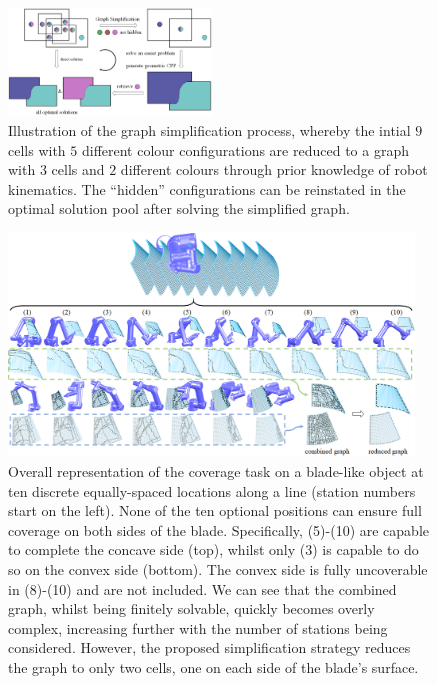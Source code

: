 \documentclass[letterpaper, 10pt, conference]{ieeeconf}
\begin{document}
\begin{figure}[t]
\centering
\includegraphics[width = 0.48\textwidth]{figures/graph_simplification}
\caption{Illustration of the graph simplification process, whereby the intial $9$ cells with $5$ different colour configurations are reduced to a graph with $3$ cells and $2$ different colours through prior knowledge of robot kinematics. The ``hidden'' configurations can be reinstated in the optimal solution pool after solving the simplified graph.}
\label{graph_simplification}
\vspace{-0.5cm}
\end{figure}



\begin{figure}[t]
\centering
\includegraphics[width = 0.96\textwidth]{figures/blade_demo/whole_process_2}
\caption{Overall representation of the coverage task on a blade-like object at ten discrete equally-spaced locations along a line (station numbers start on the left). None of the ten optional positions can ensure full coverage on both sides of the blade. Specifically, (5)-(10) are capable to complete the concave side (top), whilst only (3) is capable to do so on the convex side (bottom). The convex side is fully uncoverable in (8)-(10) and are not included. We can see that the combined graph, whilst being finitely solvable, quickly becomes overly complex, increasing further with the number of stations being considered. However, the proposed simplification strategy reduces the graph to only two cells, one on each side of the blade's surface. %
}
\label{fig:whole_process}
\vspace{-0.5cm}
\end{figure}
\end{document}
